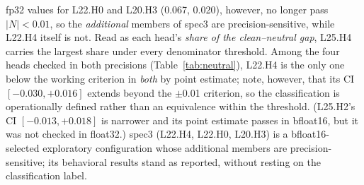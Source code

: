 \documentclass[paper]{ieice}
\newcommand{\spec}{L22.H4}
\begin{document}
fp32 values for L22.H0 and L20.H3 (0.067, 0.020), however, no longer
pass $|N|{<}0.01$, so the \emph{additional} members of spec3 are
precision-sensitive, while \spec{} itself is not. Read as each head's \emph{share of the
clean--neutral gap}, L25.H4 carries the largest share under every
denominator threshold. Among the four heads checked in both precisions
(Table~\ref{tab:neutral}), \spec{} is the only one below the working
criterion in \emph{both} by point estimate; note, however, that its
CI $[-0.030, +0.016]$ extends beyond the $\pm$0.01 criterion, so the
classification is operationally defined rather than an equivalence
within the threshold. (L25.H2's CI $[-0.013, +0.018]$ is narrower
and its point estimate passes in bfloat16, but it was not checked in
float32.) spec3 (\spec{}, L22.H0, L20.H3) is
a bfloat16-selected exploratory configuration whose additional
members are precision-sensitive; its behavioral results stand as
reported, without resting on the classification label.
\end{document}
